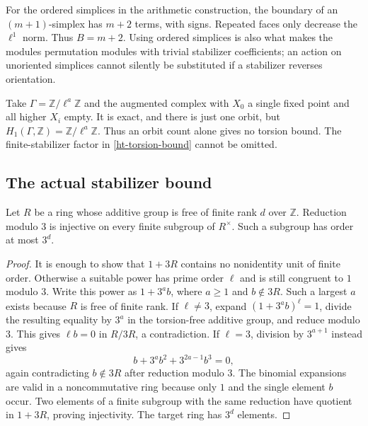 For the ordered simplices in the arithmetic construction,
the boundary of an $(m+1)$-simplex has $m+2$ terms, with signs.
Repeated faces only decrease the $\ell^1$ norm.  Thus $B=m+2$.
Using ordered simplices is also what makes the modules permutation
modules with trivial stabilizer coefficients; an action on
unoriented simplices cannot silently be substituted if a stabilizer
reverses orientation.

\begin{example}\label{ht-stabilizer-example}
Take $\Gamma=\mathbb Z/\ell^a\mathbb Z$ and the augmented complex
with $X_0$ a single fixed point and all higher $X_i$ empty.
It is exact, and there is just one orbit, but
$H_1(\Gamma,\mathbb Z)=\mathbb Z/\ell^a\mathbb Z$.
Thus an orbit count alone gives no torsion bound.
The finite-stabilizer factor in
\eqref{ht-torsion-bound} cannot be omitted.
\end{example}

\subsection{The actual stabilizer bound}

\begin{lemma}\label{ht-congruence-three}
Let $R$ be a ring whose additive group is free of finite rank $d$
over $\mathbb Z$.  Reduction modulo $3$ is injective on every
finite subgroup of $R^\times$.  Such a subgroup has order
at most $3^d$.
\end{lemma}
\begin{proof}
It is enough to show that $1+3R$ contains no nonidentity unit
of finite order.  Otherwise a suitable power has prime order
$\ell$ and is still congruent to $1$ modulo $3$.
Write this power as $1+3^a b$, where $a\ge1$ and
$b\notin3R$.  Such a largest $a$ exists because $R$ is free
of finite rank.
If $\ell\ne3$, expand $(1+3^a b)^\ell=1$, divide the resulting
equality by $3^a$ in the torsion-free additive group, and reduce
modulo $3$.  This gives $\ell b=0$ in $R/3R$, a contradiction.
If $\ell=3$, division by $3^{a+1}$ instead gives
\[
                    b+3^a b^2+3^{2a-1}b^3=0,
\]
again contradicting $b\notin3R$ after reduction modulo $3$.
The binomial expansions are valid in a noncommutative ring
because only $1$ and the single element $b$ occur.
Two elements of a finite subgroup with the same reduction
have quotient in $1+3R$, proving injectivity.  The target
ring has $3^d$ elements.
\end{proof}

